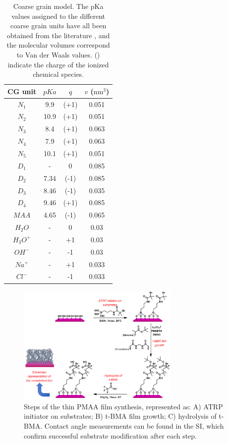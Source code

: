 \begin{table}[!ht]
	\begin{centering}
		\centering
		\setlength{\tabcolsep}{2.2pt}
		\begin{tabular}{|cccc|}
			\hline 
			\hspace{0pt}CG unit   & $pKa$ & $q$  & $v$ ($\text{nm}^3$)  \\ \hline
			$N_1$& 9.9 & (+1) &0.051\\
			$N_2$& 10.9& (+1) & 0.051\\ 
		     $N_3$& 8.4& (+1)& 0.063\\
		     $N_4$&7.9& (+1) & 0.063\\
		     $N_5$& 10.1& (+1)& 0.051\\
		      $D_1$&  - & 0 &0.085\\
		     $D_2$& 7.34 & (-1) & 0.085\\ 
			 $D_3$&  8.46& (-1)& 0.035\\
			$D_4$&  9.46 & (+1) &0.085\\ 
			$MAA$&  4.65 & (-1) & 0.065\\
			$H_2O$ & - & 0 & 0.03\\
			$H_3O^+$ & - & +1 & 0.03\\
			$OH^-$ & - & -1 & 0.03\\
			$Na^+$ & - & +1 & 0.033\\ 
			$Cl^-$ & - & -1 & 0.033\\ \hline
		\end{tabular}		
		\caption{Coarse grain model. The pKa values assigned to the different coarse grain units have all been obtained from the literature , and the molecular volumes correspond to Van der Waals values. \footnotesize{() indicate the charge of the ionized chemical species.}}
		\label{table:CG}
	\end{centering}
\end{table}



\begin{figure}[!htb]
	\centering
	\includegraphics[width=0.7\textwidth]{Figures/graph-film/exp_synt_scheme.png}
	\caption{Steps of the thin PMAA film synthesis, represented as: A) ATRP initiator on substrates; B) t-BMA film growth; C) hydrolysis of t-BMA.
		Contact angle measurements can be found in the SI, which confirm successful substrate modification after each step.}
	\label{fig:film:synthesis_scheme}
\end{figure}




